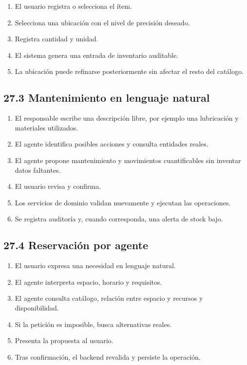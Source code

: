 \documentclass[12pt]{article}
\begin{document}
\begin{enumerate}[leftmargin=1.2cm]
    \item El usuario registra o selecciona el ítem.
    \item Selecciona una ubicación con el nivel de precisión deseado.
    \item Registra cantidad y unidad.
    \item El sistema genera una entrada de inventario auditable.
    \item La ubicación puede refinarse posteriormente sin afectar el resto del catálogo.
\end{enumerate}

\subsection*{27.3 Mantenimiento en lenguaje natural}

\begin{enumerate}[leftmargin=1.2cm]
    \item El responsable escribe una descripción libre, por ejemplo una lubricación y materiales utilizados.
    \item El agente identifica posibles acciones y consulta entidades reales.
    \item El agente propone mantenimiento y movimientos cuantificables sin inventar datos faltantes.
    \item El usuario revisa y confirma.
    \item Los servicios de dominio validan nuevamente y ejecutan las operaciones.
    \item Se registra auditoría y, cuando corresponda, una alerta de stock bajo.
\end{enumerate}

\subsection*{27.4 Reservación por agente}

\begin{enumerate}[leftmargin=1.2cm]
    \item El usuario expresa una necesidad en lenguaje natural.
    \item El agente interpreta espacio, horario y requisitos.
    \item El agente consulta catálogo, relación entre espacio y recursos y disponibilidad.
    \item Si la petición es imposible, busca alternativas reales.
    \item Presenta la propuesta al usuario.
    \item Tras confirmación, el backend revalida y persiste la operación.
\end{enumerate}
\end{document}
